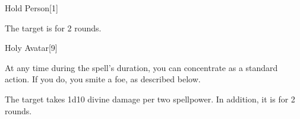 \begin{spellsection}{Hold Person}[1]
    \begin{spellheader}
    \end{spellheader}
    \begin{spellcontent}
        \begin{spelltargetinginfo}
        \end{spelltargetinginfo}
        \begin{spelleffects}
            \spelleffect The target is \immobilized for 2 rounds.
        \end{spelleffects}
    \end{spellcontent}
    \begin{spellfooter}
        \miscastrandom
    \end{spellfooter}
    \begin{spellaugments}
    \end{spellaugments}
\end{spellsection}

\begin{spellsection}{Holy Avatar}[9]
    \begin{spellheader}
    \end{spellheader}
    \begin{spellcontent}
        \begin{spelltargetinginfo}
        \end{spelltargetinginfo}
        \begin{spelleffects}
            \spelleffect At any time during the spell's duration, you can concentrate as a standard action. If you do, you smite a foe, as described below.
            \spelldur \durlong
        \end{spelleffects}
    \end{spellcontent}
    \begin{spellsubcontent}
        \begin{spelltargetinginfo}
        \end{spelltargetinginfo}
        \begin{spelleffects}
            \spelleffect The target takes 1d10 divine damage per two spellpower. In addition, it is \dazed for 2 rounds.
        \end{spelleffects}
    \end{spellsubcontent}
    \begin{spellfooter}
        \miscastexplode
    \end{spellfooter}
\end{spellsection}

